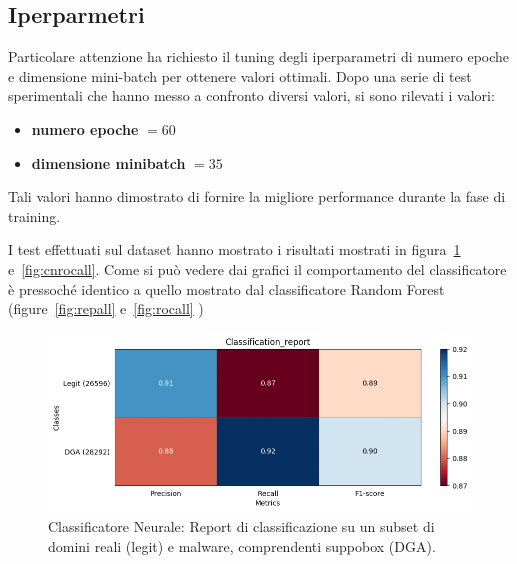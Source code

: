 \newpage
\subsection{Iperparmetri}
Particolare attenzione ha richiesto il tuning degli iperparametri di numero epoche e dimensione mini-batch per ottenere valori ottimali. Dopo una serie di test sperimentali che hanno messo a confronto diversi valori, si sono rilevati i valori:

\begin{itemize}
\item \textbf{numero epoche} $= 60$
\item \textbf{dimensione minibatch} $= 35$ 
\end{itemize}

Tali valori hanno dimostrato di fornire la migliore performance durante la fase di training.

I test effettuati sul dataset hanno mostrato i risultati mostrati in figura~\ref{fig:cnrepall} e~\ref{fig:cnrocall}. Come si può vedere dai grafici il comportamento del classificatore è pressoché identico a quello mostrato dal classificatore Random Forest (figure~\ref{fig:repall} e~\ref{fig:rocall} )

\begin{figure}[!bp]
    \centering
    \includegraphics[width=\columnwidth]{figures/clas_nn/class_rep.png}
    \caption{Classificatore Neurale: Report di classificazione su un subset di domini reali (legit) e malware, comprendenti suppobox (DGA).\label{fig:cnrepall}}
\end{figure}

